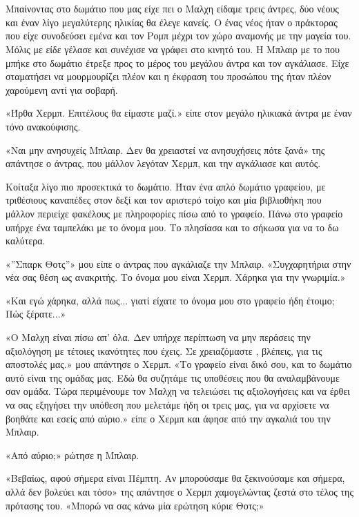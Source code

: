 \documentclass[12pt,twoside, openany]{book}
\begin{document}
\chapter{}

Μπαίνοντας στο δωμάτιο που μας είχε πει ο Μαλχη είδαμε τρεις άντρες, δύο νέους και έναν λίγο μεγαλύτερης ηλικίας θα έλεγε κανείς. Ο ένας νέος ήταν ο πράκτορας που είχε συνοδεύσει εμένα και τον Ρομπ μέχρι τον χώρο αναμονής με την μαγεία του. Μόλις με είδε γέλασε και συνέχισε να γράφει στο κινητό του. Η Μπλαιρ με το που μπήκε στο δωμάτιο έτρεξε προς το μέρος του μεγάλου άντρα και τον αγκάλιασε. Είχε σταματήσει να μουρμουρίζει πλέον και η έκφραση του προσώπου της ήταν πλέον χαρούμενη αντί για σοβαρή.

«Ήρθα Χερμπ. Επιτέλους θα είμαστε μαζί.» είπε στον μεγάλο ηλικιακά άντρα με έναν τόνο ανακούφισης.

«Ναι μην ανησυχείς Μπλαιρ. Δεν θα χρειαστεί να ανησυχήσεις πότε ξανά» της απάντησε ο άντρας, που μάλλον λεγόταν Χερμπ, και την αγκάλιασε και αυτός.

Κοίταξα λίγο πιο προσεκτικά το δωμάτιο. Ήταν ένα απλό δωμάτιο γραφείου, με τριθέσιους καναπέδες στον δεξί και τον αριστερό τοίχο και μία βιβλιοθήκη που μάλλον περιείχε φακέλους με πληροφορίες πίσω από το γραφείο. Πάνω στο γραφείο υπήρχε ένα ταμπελάκι με το όνομα μου. Το πλησίασα και το σήκωσα για να το δω καλύτερα.

«”Σπαρκ Θοτς”» μου είπε ο άντρας που αγκάλιαζε την Μπλαιρ. «Συγχαρητήρια στην νέα σας θέση ως ανακριτής. Το όνομα μου είναι Χερμπ. Χάρηκα για την γνωριμία.»

«Και εγώ χάρηκα, αλλά πως... γιατί είχατε το όνομα μου στο γραφείο ήδη έτοιμο; Πώς ξέρατε...»

«Ο Μαλχη είναι πίσω απ’ όλα. Δεν υπήρχε περίπτωση να μην περάσεις την αξιολόγηση με τέτοιες ικανότητες που έχεις. Σε χρειαζόμαστε , βλέπεις, για τις αποστολές μας.» μου απάντησε ο Χερμπ. «Το γραφείο είναι δικό σου, και το δωμάτιο αυτό είναι της ομάδας μας. Εδώ θα συζητάμε τις υποθέσεις που θα αναλαμβάνουμε σαν ομάδα. Τώρα περιμένουμε τον Μαλχη να τελειώσει τις αξιολογήσεις και να έρθει να σας εξηγήσει την υπόθεση που μελετάμε ήδη οι τρεις μας, για να αρχίσετε να βοηθάτε και εσείς από αύριο.» είπε ο Χερμπ και άφησε από την αγκαλιά του την Μπλαιρ.

«Από αύριο;» ρώτησε η Μπλαιρ.

«Βεβαίως, αφού σήμερα είναι Πέμπτη. Αν μπορούσαμε θα ξεκινούσαμε και σήμερα, αλλά δεν βολεύει και τόσο» της απάντησε ο Χερμπ χαμογελώντας ζεστά στο τέλος της πρότασης του. «Μπορώ να σας κάνω μία ερώτηση κύριε Θοτς;»
\end{document}
